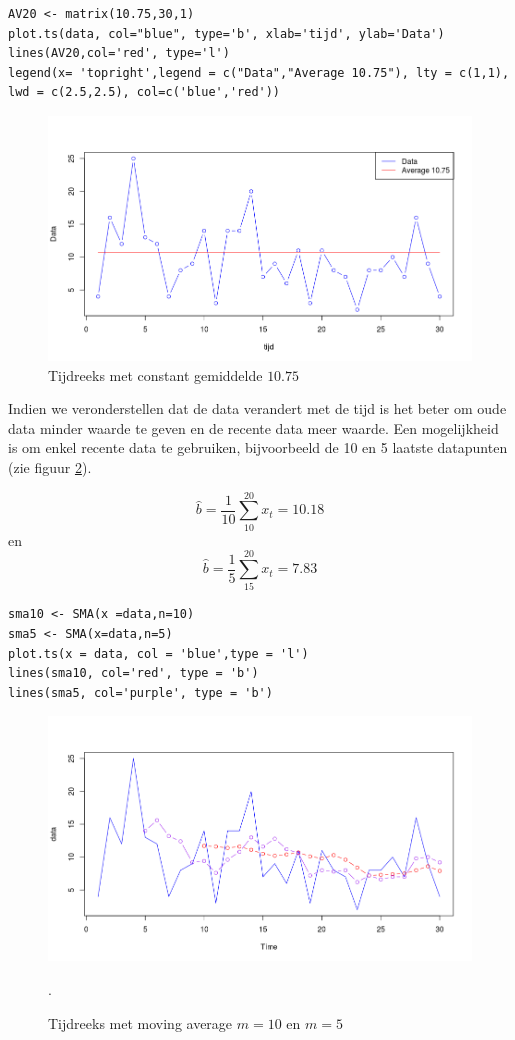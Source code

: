\begin{lstlisting}
AV20 <- matrix(10.75,30,1)
plot.ts(data, col="blue", type='b', xlab='tijd', ylab='Data')
lines(AV20,col='red', type='l')
legend(x= 'topright',legend = c("Data","Average 10.75"), lty = c(1,1), lwd = c(2.5,2.5), col=c('blue','red'))
\end{lstlisting}

\begin{figure}[htbp]
	\centering
		\includegraphics[width=1.00\textwidth]{images/tijdsreeksen/tijdsreeks20.png}
	\caption{Tijdreeks met constant gemiddelde $10.75$}
	\label{fig:tijdreeks21}
\end{figure}


Indien we veronderstellen dat de data verandert met de tijd is het beter om oude data minder waarde te geven en de recente data meer waarde. Een mogelijkheid is om enkel recente data te gebruiken, bijvoorbeeld de 10 en 5 laatste datapunten (zie figuur \ref{fig:tijdreeks31}).

\[ \widehat{b} = \frac{1}{10} \sum_{10}^{20} x_{t} = 10.18 \] en
\[ \widehat{b} = \frac{1}{5} \sum_{15}^{20} x_{t} = 7.83 \]

\begin{lstlisting}
sma10 <- SMA(x =data,n=10)
sma5 <- SMA(x=data,n=5)
plot.ts(x = data, col = 'blue',type = 'l')
lines(sma10, col='red', type = 'b')
lines(sma5, col='purple', type = 'b')
\end{lstlisting}

\begin{figure}
	\centering
		\includegraphics[width=1.00\textwidth]{images/tijdsreeksen/tijdsreekssma.png}
		\caption{Tijdreeks met moving average $m = 10$ en $m=5$}. 
	\label{fig:tijdreeks31}
\end{figure}




